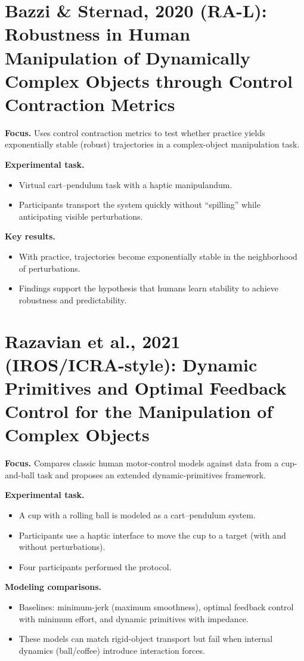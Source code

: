 \documentclass[11pt]{article}
\begin{document}
\section{Bazzi \& Sternad, 2020 (RA-L): Robustness in Human Manipulation of Dynamically Complex Objects through Control Contraction Metrics}
\textbf{Focus.} Uses control contraction metrics to test whether practice yields exponentially stable (robust) trajectories in a complex-object manipulation task.

\textbf{Experimental task.}
\begin{itemize}[leftmargin=1.2em]
  \item Virtual cart--pendulum task with a haptic manipulandum.
  \item Participants transport the system quickly without ``spilling'' while anticipating visible perturbations.
\end{itemize}

\textbf{Key results.}
\begin{itemize}[leftmargin=1.2em]
  \item With practice, trajectories become exponentially stable in the neighborhood of perturbations.
  \item Findings support the hypothesis that humans learn stability to achieve robustness and predictability.
\end{itemize}

\section{Razavian et al., 2021 (IROS/ICRA-style): Dynamic Primitives and Optimal Feedback Control for the Manipulation of Complex Objects}
\textbf{Focus.} Compares classic human motor-control models against data from a cup-and-ball task and proposes an extended dynamic-primitives framework.

\textbf{Experimental task.}
\begin{itemize}[leftmargin=1.2em]
  \item A cup with a rolling ball is modeled as a cart--pendulum system.
  \item Participants use a haptic interface to move the cup to a target (with and without perturbations).
  \item Four participants performed the protocol.
\end{itemize}

\textbf{Modeling comparisons.}
\begin{itemize}[leftmargin=1.2em]
  \item Baselines: minimum-jerk (maximum smoothness), optimal feedback control with minimum effort, and dynamic primitives with impedance.
  \item These models can match rigid-object transport but fail when internal dynamics (ball/coffee) introduce interaction forces.
\end{itemize}
\end{document}
